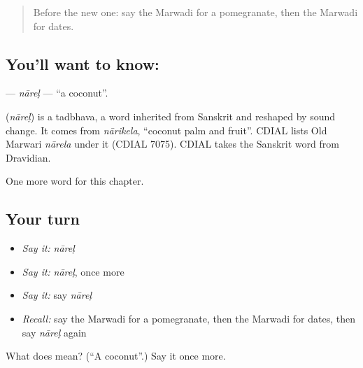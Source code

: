 \label{lesson:MW-C137-narel}



\begin{quote}
Before the new one: say the Marwadi for a pomegranate, then the Marwadi for dates.
\end{quote}

\subsection*{You'll want to know: }
\textbf{} — \emph{nāreḷ} — \textquotedblleft{}a coconut\textquotedblright{}.

\begin{cousinweb}
\textbf{} (\emph{nāreḷ}) is a tadbhava, a word inherited from Sanskrit and reshaped by sound change. It comes from \emph{nārikela}, \textquotedblleft{}coconut palm and fruit\textquotedblright{}. CDIAL lists Old Marwari \emph{nārela} under it (CDIAL 7075). CDIAL takes the Sanskrit word from Dravidian.
\end{cousinweb}

\begin{grammarlens}[title={What you've built}]
One more word for this chapter.
\end{grammarlens}

\subsection*{Your turn}
\begin{itemize}
\raggedright
  \item \emph{Say it:} \emph{nāreḷ}
  \item \emph{Say it:} \emph{nāreḷ}, once more
  \item \emph{Say it:} say \emph{nāreḷ}
  \item \emph{Recall:} say the Marwadi for a pomegranate, then the Marwadi for dates, then say \emph{nāreḷ} again
\end{itemize}

\begin{tcolorbox}[breakable,colback=teal!4,colframe=teal!35!black,title={Before you move on}]
What does  mean? (\textquotedblleft{}A coconut\textquotedblright{}.) Say it once more.
\end{tcolorbox}
